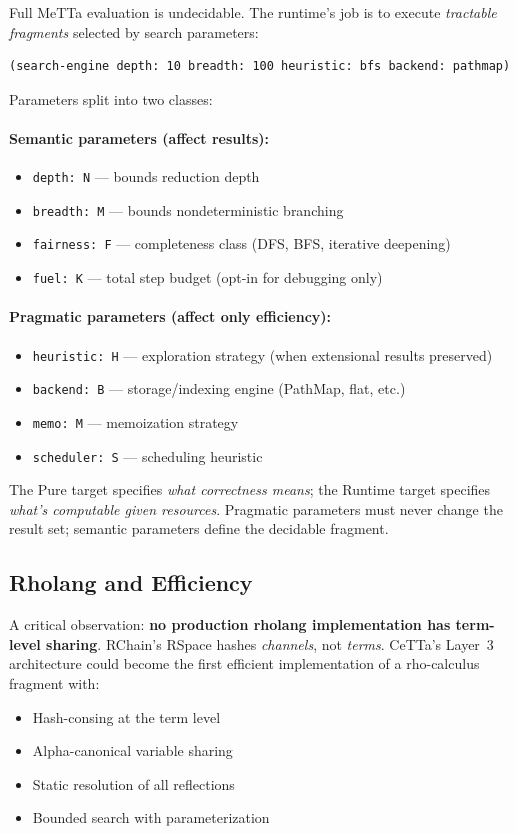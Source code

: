\documentclass[11pt]{article}
\newcommand{\code}[1]{\texttt{#1}}
\newcommand{\CeTTa}{\textup{CeTTa}}
\begin{document}
Full MeTTa evaluation is undecidable.  The runtime's job is to execute
\emph{tractable fragments} selected by search parameters:

\begin{lstlisting}
(search-engine depth: 10 breadth: 100 heuristic: bfs backend: pathmap)
\end{lstlisting}

Parameters split into two classes:

\paragraph{Semantic parameters (affect results):}
\begin{itemize}
\item \code{depth: N} --- bounds reduction depth
\item \code{breadth: M} --- bounds nondeterministic branching
\item \code{fairness: F} --- completeness class (DFS, BFS, iterative deepening)
\item \code{fuel: K} --- total step budget (opt-in for debugging only)
\end{itemize}

\paragraph{Pragmatic parameters (affect only efficiency):}
\begin{itemize}
\item \code{heuristic: H} --- exploration strategy (when extensional results preserved)
\item \code{backend: B} --- storage/indexing engine (PathMap, flat, etc.)
\item \code{memo: M} --- memoization strategy
\item \code{scheduler: S} --- scheduling heuristic
\end{itemize}

The Pure target specifies \emph{what correctness means}; the Runtime
target specifies \emph{what's computable given resources}.  Pragmatic
parameters must never change the result set; semantic parameters define
the decidable fragment.

\subsection{Rholang and Efficiency}

A critical observation: \textbf{no production rholang implementation has
term-level sharing}.  RChain's RSpace hashes \emph{channels}, not
\emph{terms}.  \CeTTa{}'s Layer~3 architecture could become the first
efficient implementation of a rho-calculus fragment with:
\begin{itemize}
\item Hash-consing at the term level
\item Alpha-canonical variable sharing
\item Static resolution of all reflections
\item Bounded search with parameterization
\end{itemize}
\end{document}
